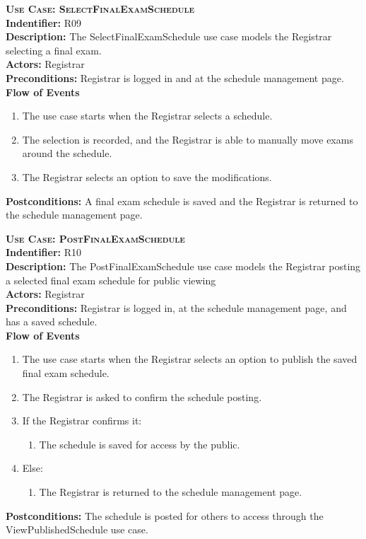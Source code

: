 \documentclass[11pt]{article}
\newenvironment{usecase}{%
	\def\title##1{ {\large \bfseries  \scshape {Use Case:} ##1} \\ }
 	\def\id##1{{\bf Indentifier:} ##1\\}
	\def\des##1{ {\bf Description:} ##1\\}
	\def\actors##1{ {\bf Actors:} ##1\\}
    	\def\pre##1{ {\bf Preconditions:} ##1 \\} %
    	\def\flow##1{ {\bf Flow of Events} ##1}%
    	\newenvironment{ucenum}{%
        	\begin{enumerate}[nolistsep]\small}%
        	{\end{enumerate}}
	\def\post##1{ {\bf Postconditions:} ##1 \\}
}{\vspace{.05in}}
\begin{document}
\begin{usecase}
  \title{SelectFinalExamSchedule}
  \id{R09}
  \des{The SelectFinalExamSchedule use case models the Registrar selecting a final exam.}
  \actors{Registrar}
  \pre{Registrar is logged in and at the schedule management page.}
  \flow{}
  \begin{ucenum}
  \item The use case starts when the Registrar selects a schedule.
  \item The selection is recorded, and the Registrar is able to manually move exams around the schedule.
  \item The Registrar selects an option to save the modifications.
  \end{ucenum}
  \post{A final exam schedule is saved and the Registrar is returned to the schedule management page.}
\end{usecase}

\begin{usecase}
  \title{PostFinalExamSchedule}
  \id{R10}
  \des{The PostFinalExamSchedule use case models the Registrar posting a selected final exam schedule for public viewing}
  \actors{Registrar}
  \pre{Registrar is logged in, at the schedule management page, and has a saved schedule.}
  \flow{}
  \begin{ucenum}
  \item The use case starts when the Registrar selects an option to publish the saved final exam schedule.
  \item The Registrar is asked to confirm the schedule posting.
  \item If the Registrar confirms it:
    \begin{ucenum} \item The schedule is saved for access by the public. \end{ucenum}
  \item Else:
    \begin{ucenum} \item The Registrar is returned to the schedule management page. \end{ucenum}
  \end{ucenum}
  \post{The schedule is posted for others to access through the ViewPublishedSchedule use case.}
\end{usecase}
\end{document}
